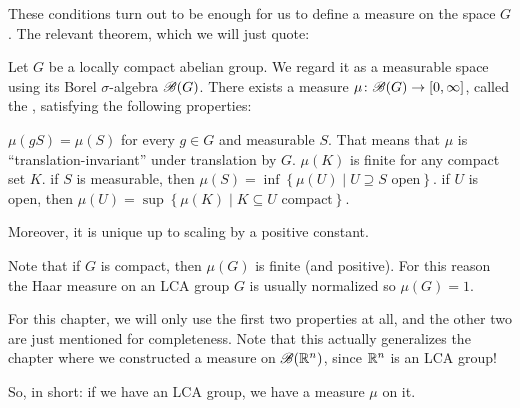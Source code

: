 These conditions turn out to be enough
for us to define a measure on the space $G$.
The relevant theorem, which we will just quote:
\begin{theorem}
	Let $G$ be a locally compact abelian group.
	We regard it as a measurable space using its Borel $\sigma$-algebra $\mathscr B(G)$.
	There exists a measure $\mu \colon \mathscr B(G) \to [0,\infty]$, called the ,
	satisfying the following properties:
	\begin{itemize}
		\ii $\mu(gS) = \mu(S)$ for every $g \in G$ and measurable $S$.
		That means that $\mu$ is ``translation-invariant'' under translation by $G$.
		\ii $\mu(K)$ is finite for any compact set $K$.
		\ii if $S$ is measurable, then $\mu(S) = \inf\left\{ \mu(U) \mid U \supseteq S \text{ open} \right\}$.
		\ii if $U$ is open, then $\mu(U) = \sup\left\{ \mu(K) \mid K \subseteq U \text{ compact} \right\}$.
	\end{itemize}
	Moreover, it is unique up to scaling by a positive constant.
\end{theorem}

\begin{remark}
	Note that if $G$ is compact, then $\mu(G)$ is finite (and positive).
	For this reason the Haar measure on an LCA group $G$
	is usually normalized so $\mu(G) = 1$.
\end{remark}

For this chapter, we will only use the first two properties at all,
and the other two are just mentioned for completeness.
Note that this actually generalizes the chapter where
we constructed a measure on $\mathscr B(\mathbb R^n)$, since $\mathbb R^n$ is an LCA group!

So, in short: if we have an LCA group, we have a measure $\mu$ on it.

